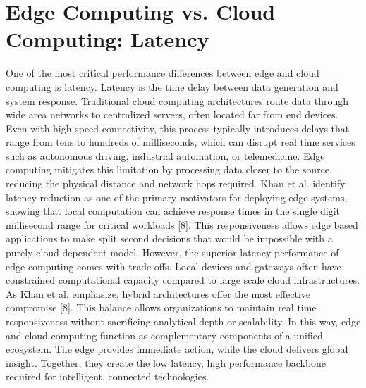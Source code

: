 \documentclass[conference]{IEEEtran}
\begin{document}
{\section{Edge Computing vs. Cloud Computing: Latency}
One of the most critical performance differences between edge and cloud computing is latency. Latency is the time delay between data generation and system response. Traditional cloud computing architectures route data through wide area networks to centralized servers, often located far from end devices. Even with high speed connectivity, this process typically introduces delays that range from tens to hundreds of milliseconds, which can disrupt real time services such as autonomous driving, industrial automation, or telemedicine. Edge computing mitigates this limitation by processing data closer to the source, reducing the physical distance and network hops required. Khan et al. identify latency reduction as one of the primary motivators for deploying edge systems, showing that local computation can achieve response times in the single digit millisecond range for critical workloads [8]. This responsiveness allows edge based applications to make split second decisions that would be impossible with a purely cloud dependent model.
However, the superior latency performance of edge computing comes with trade offs. Local devices and gateways often have constrained computational capacity compared to large scale cloud infrastructures. As Khan et al. emphasize, hybrid architectures offer the most effective compromise [8]. This balance allows organizations to maintain real time responsiveness without sacrificing analytical depth or scalability. In this way, edge and cloud computing function as complementary components of a unified ecosystem. The edge provides immediate action, while the cloud delivers global insight. Together, they create the low latency, high performance backbone required for intelligent, connected technologies.


}
\end{document}
